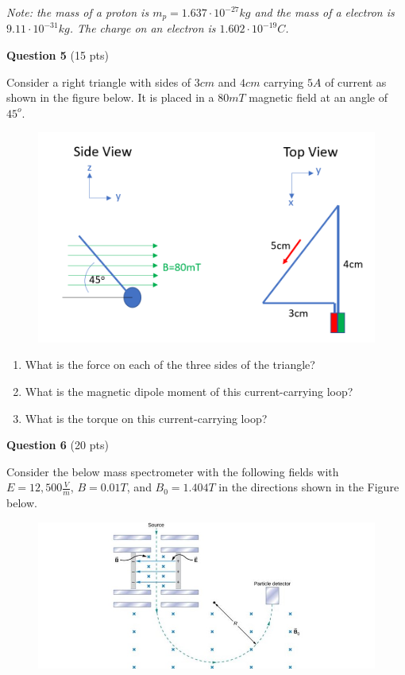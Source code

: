 \documentclass[14pt]{report}
\begin{document}
\textit{Note: the mass of a proton is $m_p = 1.637 \cdot 10^{-27} kg$ and the mass of a electron is $9.11 \cdot 10^{-31} kg$. The charge on an electron is $1.602 \cdot 10^{-19} C$.}

\newpage
\textbf{Question 5} (15 pts)

Consider a right triangle with sides of $3cm$ and $4cm$ carrying $5A$ of current as shown in the figure below. It is placed in a $80mT$ magnetic field at an angle of $45^o$.

\begin{figure}[H]
\begin{center}
\includegraphics[scale=0.80]{magneticdipole.png}
\end{center}
\end{figure}

\begin{enumerate}[label=\Alph*]
\item What is the force on each of the three sides of the triangle?
\item What is the magnetic dipole moment of this current-carrying loop?
\item What is the torque on this current-carrying loop?
\end{enumerate}



\textbf{Question 6} (20 pts)

Consider the below mass spectrometer with the following fields with $E = 12,500 \frac{V}{m}$, $B = 0.01T$, and $B_0 = 1.404 T$ in the directions shown in the Figure below. 

\begin{figure}[H]
\begin{center}
\includegraphics[scale=0.60]{fig_11_19.jpg}
\end{center}
\end{figure}
\end{document}
